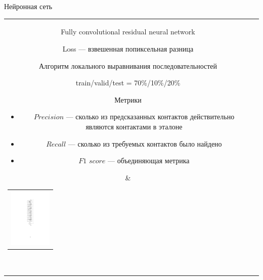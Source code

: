 \documentclass{beamer}
\begin{document}
\begin{frame}{Нейронная сеть}

\begin{tabular}{cl}  
    \parbox{0.75\linewidth}{
        \begin{itemize}
            \item Fully convolutional residual neural network
            \item Loss --- взвешенная попиксельная разница
            \item Алгоритм локального выравнивания последовательностей
            \item train/valid/test = 70\%/10\%/20\%
              {\item Метрики
            \begin{itemize}
                \item $Precision$ --- сколько из предсказанных контактов действительно являются контактами в эталоне
                \item $Recall$ --- сколько из требуемых контактов было найдено
                \item $F1$ $score$ --- объединяющая метрика
            \end{itemize}}
        \end{itemize}
    }
    & \begin{tabular}{l}
        \includegraphics[width=2.0cm]{pics/res_unit.pdf}
    \end{tabular}  \\
\end{tabular}
    
\end{frame}
\end{document}
